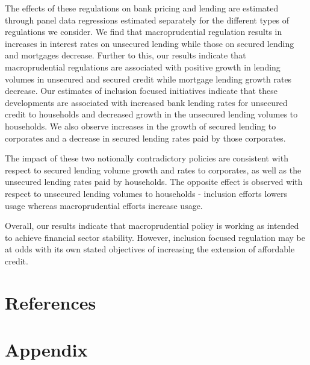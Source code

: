 \documentclass[
  letterpaper,
  DIV=11,
  numbers=noendperiod]{scrartcl}
\begin{document}
The effects of these regulations on bank pricing and lending are
estimated through panel data regressions estimated separately for the
different types of regulations we consider. We find that macroprudential
regulation results in increases in interest rates on unsecured lending
while those on secured lending and mortgages decrease. Further to this,
our results indicate that macroprudential regulations are associated
with positive growth in lending volumes in unsecured and secured credit
while mortgage lending growth rates decrease. Our estimates of inclusion
focused initiatives indicate that these developments are associated with
increased bank lending rates for unsecured credit to households and
decreased growth in the unsecured lending volumes to households. We also
observe increases in the growth of secured lending to corporates and a
decrease in secured lending rates paid by those corporates.

The impact of these two notionally contradictory policies are consistent
with respect to secured lending volume growth and rates to corporates,
as well as the unsecured lending rates paid by households. The opposite
effect is observed with respect to unsecured lending volumes to
households - inclusion efforts lowers usage whereas macroprudential
efforts increase usage.

Overall, our results indicate that macroprudential policy is working as
intended to achieve financial sector stability. However, inclusion
focused regulation may be at odds with its own stated objectives of
increasing the extension of affordable credit.

\newpage

\section{References}\label{references}

\renewcommand{\bibsection}{}


\setcounter{section}{0}
\renewcommand{\thesection}{\Alph{section}}

\setcounter{table}{0}
\renewcommand{\thetable}{A\arabic{table}}

\setcounter{figure}{0}
\renewcommand{\thefigure}{A\arabic{figure}}

\newpage

\section{Appendix}\label{appendix}
\end{document}
